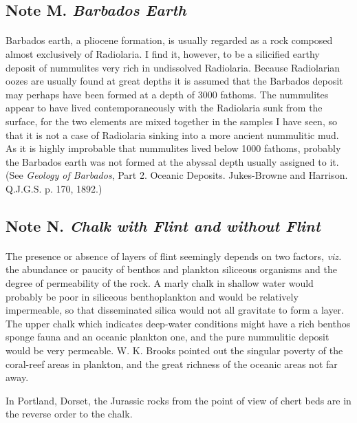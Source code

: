 \documentclass[a4paper, 12pt, oneside]{article}
\begin{document}
\subsection{Note M. \emph{Barbados Earth}}
\paragraph{}
Barbados earth, a pliocene formation, is usually regarded as a rock composed almost exclusively of Radiolaria. I find it, however, to be a silicified earthy deposit of nummulites very rich in undissolved Radiolaria. Because Radiolarian oozes are usually found at great depths it is assumed that the Barbados deposit may perhaps have been formed at a depth of 3000 fathoms. The nummulites appear to have lived contemporaneously with the Radiolaria sunk from the surface, for the two elements are mixed together in the samples I have seen, so that it is not a case of Radiolaria sinking into a more ancient nummulitic mud. As it is highly improbable that nummulites lived below 1000 fathoms, probably the Barbados earth was not formed at the abyssal depth usually assigned to it. (See \emph{Geology of Barbados}, Part 2. Oceanic Deposits. Jukes-Browne and Harrison. Q.J.G.S. p. 170, 1892.)

\subsection{Note N. \emph{Chalk with Flint and without Flint}}
\paragraph{}
The presence or absence of layers of flint seemingly depends on two factors, \emph{viz.} the abundance or paucity of benthos and plankton siliceous organisms and the degree of permeability of the rock. A marly chalk in shallow water would probably be poor in siliceous benthoplankton and would be relatively impermeable, so that disseminated silica would not all gravitate to form a layer. The upper chalk which indicates deep-water conditions might have a rich benthos sponge fauna and an oceanic plankton one, and the pure nummulitic deposit would be very permeable. W. K. Brooks pointed out the singular poverty of the coral-reef areas in plankton, and the great richness of the oceanic areas not far away.

In Portland, Dorset, the Jurassic rocks from the point of view of chert beds are in the reverse order to the chalk.
\end{document}
